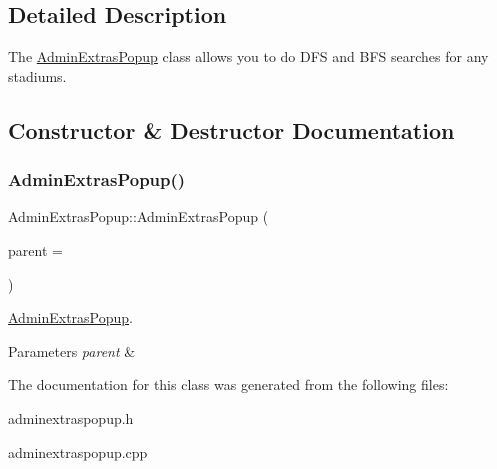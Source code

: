 \subsection{Detailed Description}
The \hyperlink{class_admin_extras_popup}{Admin\+Extras\+Popup} class allows you to do D\+FS and B\+FS searches for any stadiums. 

\subsection{Constructor \& Destructor Documentation}
\mbox{\label{class_admin_extras_popup_aabaeaaf01620c0152932fe79a4753964}} 
\subsubsection{\texorpdfstring{Admin\+Extras\+Popup()}{AdminExtrasPopup()}}
{\footnotesize\ttfamily Admin\+Extras\+Popup\+::\+Admin\+Extras\+Popup (\begin{DoxyParamCaption}\item[{Q\+Widget $\ast$}]{parent = {} }\end{DoxyParamCaption})\hspace{0.3cm}{\ttfamily [explicit]}}



\hyperlink{class_admin_extras_popup}{Admin\+Extras\+Popup}. 


\begin{DoxyParams}{Parameters}
{\em parent} & \\
\hline
\end{DoxyParams}


The documentation for this class was generated from the following files\+:\begin{DoxyCompactItemize}
\item 
adminextraspopup.\+h\item 
adminextraspopup.\+cpp\end{DoxyCompactItemize}
